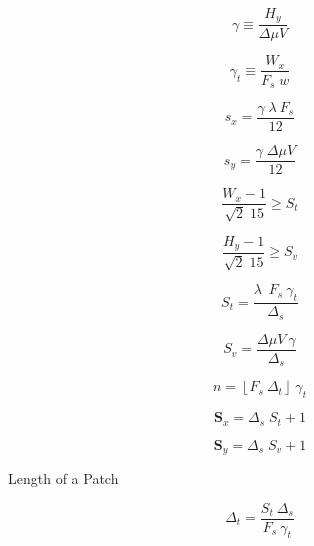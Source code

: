 \begin{equation}
\gamma \equiv \frac{H_y}{\Delta \mu V}  
\label{eq:gammadefinition}
\end{equation}

\begin{equation}
\gamma_t \equiv \frac{W_x}{F_s \; w}  
\label{eq:gammatdefinition}
\end{equation}

\begin{equation}
s_x = \frac{ \gamma \;  \lambda \  F_s}{12}
\label{eq:mapping2}
\end{equation}

\begin{equation}
s_y= \frac{\gamma \; \Delta \mu V}{12} 
\label{eq:mapping1}
\end{equation}


\begin{equation}
\frac{W_x-1}{\sqrt{2} \; 15}  \geq S_t 
\label{eq:restriction1}
\end{equation}

\begin{equation}
\frac{H_y-1}{\sqrt{2} \; 15}  \geq S_v 
\label{eq:restriction2}
\end{equation}

\begin{equation}
S_t = \frac{ \lambda \;  \  F_s \ \gamma_t }{\Delta_s}
\label{eq:mapping2}
\end{equation}

\begin{equation}
S_v= \frac{\Delta \mu V \ \gamma}{\Delta_s} 
\label{eq:mapping1}
\end{equation}



\begin{equation}
n = \left\lfloor F_s \ \Delta_t \right\rfloor \ \gamma_t
\label{eq:mapping1}
\end{equation}



\begin{equation}
\mathbf{S}_x = \Delta_s \; S_t + 1
\label{eq:mapping2}
\end{equation}

\begin{equation}
\mathbf{S}_y = \Delta_s \; S_v + 1
\label{eq:mapping1}
\end{equation}


Length of a Patch

\begin{equation}
\Delta_t = \frac{S_t \ \Delta_s}{F_s \ \gamma_t} 
\label{eq:mapping1}
\end{equation}

